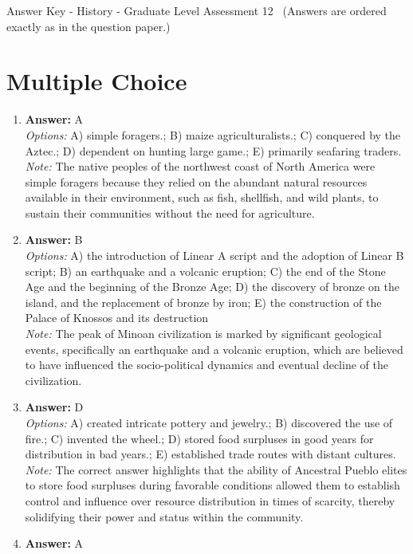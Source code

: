 \documentclass[12pt]{article}
\begin{document}
\begin{center}
Answer Key - History - Graduate Level Assessment 12 \
\small (Answers are ordered exactly as in the question paper.)
\end{center}

\section*{Multiple Choice}
\begin{enumerate}[label=\arabic*.]
\item \textbf{Answer:} A
\\ \textit{Options:} A) simple foragers.; B) maize agriculturalists.; C) conquered by the Aztec.; D) dependent on hunting large game.; E) primarily seafaring traders.
\\ \textit{Note:} The native peoples of the northwest coast of North America were simple foragers because they relied on the abundant natural resources available in their environment, such as fish, shellfish, and wild plants, to sustain their communities without the need for agriculture.
\item \textbf{Answer:} B
\\ \textit{Options:} A) the introduction of Linear A script and the adoption of Linear B script; B) an earthquake and a volcanic eruption; C) the end of the Stone Age and the beginning of the Bronze Age; D) the discovery of bronze on the island, and the replacement of bronze by iron; E) the construction of the Palace of Knossos and its destruction
\\ \textit{Note:} The peak of Minoan civilization is marked by significant geological events, specifically an earthquake and a volcanic eruption, which are believed to have influenced the socio-political dynamics and eventual decline of the civilization.
\item \textbf{Answer:} D
\\ \textit{Options:} A) created intricate pottery and jewelry.; B) discovered the use of fire.; C) invented the wheel.; D) stored food surpluses in good years for distribution in bad years.; E) established trade routes with distant cultures.
\\ \textit{Note:} The correct answer highlights that the ability of Ancestral Pueblo elites to store food surpluses during favorable conditions allowed them to establish control and influence over resource distribution in times of scarcity, thereby solidifying their power and status within the community.
\item \textbf{Answer:} A

\end{enumerate}
\end{document}
